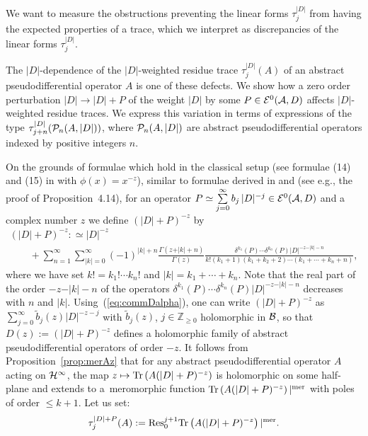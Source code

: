 \documentclass[pdftex]{sigma}
\def \Z {\mathbb Z}
\numberwithin{equation}{section}
\begin{document}
We want to measure the   obstructions preventing  the linear forms  $\tau_j^{\vert D\vert}$ from
having the  expected properties of a trace, which we interpret as
discrepancies of the linear forms $\tau_j^{\vert D\vert}$.

 The $\vert D\vert$-dependence of the $\vert D\vert$-weighted residue trace $\tau_j^{\vert D\vert}(A)$ of  an abstract
pseudo\-di\-f\/feren\-tial operator $A$   is one of these defects. We show how  a zero
order perturbation $\vert D\vert \to \vert D\vert + P$ of the weight $\vert
D\vert$ by some $P\in {\cal E}^0({\cal A}, D)$ af\/fects   $\vert
D\vert$-weighted residue traces. We express this variation  in terms of
expressions of the type $\tau_{j+n}^{\vert D\vert}({\cal P}_n(A,\vert
D\vert))$, where
${\cal P}_n(A,\vert D\vert)$ are abstract pseudodif\/ferential operators indexed by
positive integers $n$.

On the grounds of formulae which hold in the classical setup (see formulae (14)
and (15) in  \cite{Pa2} with $\phi(x)=x^{-z}$), similar to formulae derived in
\cite{CoMo} and \cite{Hig} (see e.g.,  the proof of Proposition~4.14),  for an operator  $P\simeq\sum\limits_{j=0}^\infty b_j \, \vert D\vert^{-j} \in {\cal E}^0({\cal A}, D)$ and a complex number
 $z$ we def\/ine $(\vert D\vert +P)^{-z}$ by
\begin{gather}\label{eq:phiDpert}
  (\vert D\vert+P)^{-z}
:\simeq \vert D\vert^{-z} \\
\qquad{}+\sum_{n=1}^\infty \sum_{\vert
  k\vert =0}^\infty (-1)^{\vert k\vert  +n} \frac{\Gamma(z+\vert k\vert
  +n)}{\Gamma(z)}
 \frac{\delta^{ k_1}(P)  \cdots  \delta^{ k_n}(P)   \vert D\vert^{-z-\vert k\vert -n}}{k!  (k_1+1)(k_1+k_2+2)\cdots (k_1+\cdots +k_{n}+n)}
,\nonumber
\end{gather}
where we have set $k!=k_1!\cdots k_n!$ and $\vert k\vert= k_1+\cdots +k_n$. Note
that the real part of the order $-z-\vert k\vert-n$ of the operators
$\delta^{ k_1}(P)  \cdots  \delta^{ k_n}(P)
    \vert D\vert^{-z-\vert k\vert -n}$ decreases with $n$ and $\vert k\vert$.
Using~(\ref{eq:commDalpha}), one can write  $(\vert D\vert+P)^{-z}$ as $\sum\limits_{j=0}^\infty \tilde b_j(z)  \vert D\vert^{-z-j}$ with $\tilde b_j(z)$, $j\in \Z_{\geq 0}$ holomorphic in ${\cal B}$,  so that  $D(z):=(\vert D\vert+P)^{-z}$  def\/ines a holomorphic family of abstract pseudodif\/ferential operators of order $-z$. It follows from Proposition~\ref{prop:merAz} that for any abstract pseudodif\/ferential operator $A$ acting on ${\cal H}^\infty$, the map $z\mapsto {\rm Tr} \left(A (\vert D\vert+P)^{-z}\right)$ is holomorphic on some half-plane and extends to a~meromorphic function ${\rm Tr} \left(A (\vert D\vert+P)^{-z}\right)\vert^{\rm mer}$ with  poles of order $\leq k+1$.
Let us set: \begin{gather*}%
\tau^{\vert D\vert+P}_j(A):={\rm Res}^{j+1}_{0} {\rm
    Tr} \left( A  (\vert D\vert+P)^{-z}\right)\vert^{\rm mer}.
\end{gather*}
\end{document}
